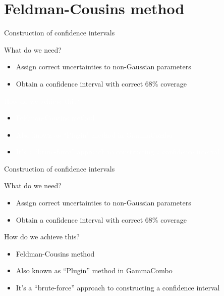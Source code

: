 \documentclass{beamer}
\newcommand{\white}[1]{{\textcolor{white}{#1}}} %
\begin{document}
\section{Feldman-Cousins method}

\begin{frame}{Construction of confidence intervals}
  \begin{center}
    {\Large What do we need?}
  \end{center}
  \begin{itemize}
    \setlength\itemsep{0.3em}
    \item{Assign correct uncertainties to non-Gaussian parameters}
    \item{Obtain a confidence interval with correct $68\%$ coverage}
  \end{itemize}
  \vspace{0.3cm}
  \begin{center}
    \white{\Large How do we achieve this?}
  \end{center}
  \begin{itemize}
    \setlength\itemsep{0.3em}
    \item[]{\white{Feldman-Cousins method}}
    \item[]{\white{Also known as ``Plugin'' method in GammaCombo}}
    \item[]{\white{It's a ``brute-force'' approach to constructing a confidence interval}}
  \end{itemize}
\end{frame}

\begin{frame}{Construction of confidence intervals}
  \begin{center}
    {\Large What do we need?}
  \end{center}
  \begin{itemize}
    \setlength\itemsep{0.3em}
    \item{Assign correct uncertainties to non-Gaussian parameters}
    \item{Obtain a confidence interval with correct $68\%$ coverage}
  \end{itemize}
  \vspace{0.3cm}
  \begin{center}
    {\Large How do we achieve this?}
  \end{center}
  \begin{itemize}
    \setlength\itemsep{0.3em}
    \item{Feldman-Cousins method}
    \item{Also known as ``Plugin'' method in GammaCombo}
    \item{It's a ``brute-force'' approach to constructing a confidence interval}
  \end{itemize}
\end{frame}
\end{document}
